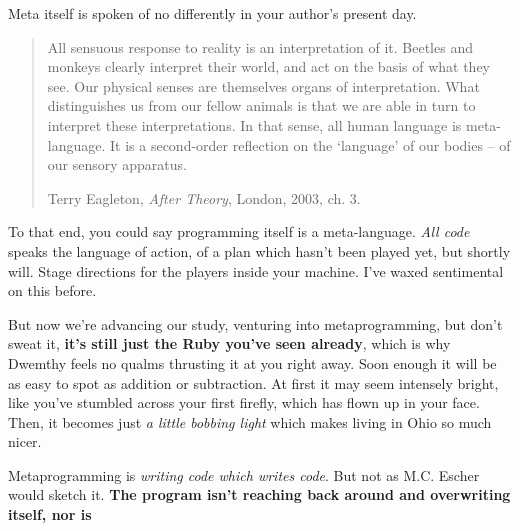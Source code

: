 \documentclass[12pt,twoside]{report}
\begin{document}
Meta itself is spoken of no differently in your author's present day.

\begin{quote}
All sensuous response to reality is an interpretation of it.  Beetles
and monkeys clearly interpret their world, and act on the basis of
what they see. Our physical senses are themselves organs of
interpretation.  What distinguishes us from our fellow animals is that
we are able in turn to interpret these interpretations.  In that
sense, all human language is meta-language.  It is a second-order
reflection on the `language' of our bodies -- of our sensory
apparatus.

Terry Eagleton, {\em After Theory}, London, 2003, ch. 3.

\end{quote}


To that end, you could say programming itself is a meta-language.
{\em All code} speaks the language of action, of a plan which hasn't
been played yet, but shortly will.  Stage directions for the players
inside your machine.  I've waxed sentimental on this before.

But now we're advancing our study, venturing into metaprogramming, but
don't sweat it, {\bf it's still just the Ruby you've seen already},
which is why Dwemthy feels no qualms thrusting it at you right away.
Soon enough it will be as easy to spot as addition or subtraction.  At
first it may seem intensely bright, like you've stumbled across your
first firefly, which has flown up in your face.  Then, it becomes just
{\em a little bobbing light} which makes living in Ohio so much nicer.

{ Metaprogramming is {\em writing code which writes code}.  But not as
M.C. Escher would sketch it.  {\bf The program isn't reaching back
  around and overwriting itself, nor is } \unskip\parfillskip 0pt \par}

\pagebreak
\end{document}
